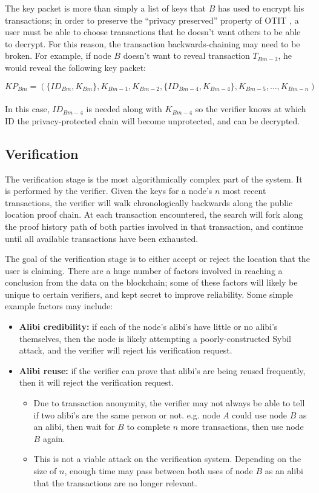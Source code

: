 \documentclass[12pt]{article}
\begin{document}
The key packet is more than simply a list of keys that $B$ has used to encrypt his transactions; in order to preserve the ``privacy preserved'' property of OTIT \cite{otit}, a user must be able to choose transactions that he doesn't want others to be able to decrypt. For this reason, the transaction backwards-chaining may need to be broken. For example, if node $B$ doesn't want to reveal transaction $T_{Bm-3}$, he would reveal the following key packet:

$KP_{Bm} = (\{ID_{Bm}, K_{Bm}\}, K_{Bm-1}, K_{Bm-2}, \{ID_{Bm-4}, K_{Bm-4}\}, K_{Bm-5}, \ldots, K_{Bm-n})$
\\
\\
\indent
In this case, $ID_{Bm-4}$ is needed along with $K_{Bm-4}$ so the verifier knows at which ID the privacy-protected chain will become unprotected, and can be decrypted.

\subsection{Verification}
The verification stage is the most algorithmically complex part of the system. It is performed by the verifier. Given the keys for a node's $n$ most recent transactions, the verifier will walk chronologically backwards along the public location proof chain. At each transaction encountered, the search will fork along the proof history path of both parties involved in that transaction, and continue until all available transactions have been exhausted.

The goal of the verification stage is to either accept or reject the location that the user is claiming. There are a huge number of factors involved in reaching a conclusion from the data on the blockchain; some of these factors will likely be unique to certain verifiers, and kept secret to improve reliability. Some simple example factors may include:
\begin{itemize}
	\item \textbf{Alibi credibility:} if each of the node’s alibi’s have little or no alibi’s themselves, then the node is likely attempting a poorly-constructed Sybil attack, and the verifier will reject his verification request.
	\item \textbf{Alibi reuse:} if the verifier can prove that alibi’s are being reused frequently, then it will reject the verification request.
	\begin{itemize}
		\item Due to transaction anonymity, the verifier may not always be able to tell if two alibi's are the same person or not. e.g. node $A$ could use node $B$ as an alibi, then wait for $B$ to complete $n$ more transactions, then use node $B$ again.
		\item This is not a viable attack on the verification system. Depending on the size of $n$, enough time may pass between both uses of node $B$ as an alibi that the transactions are no longer relevant.
	\end{itemize}
\end{itemize}
\end{document}
